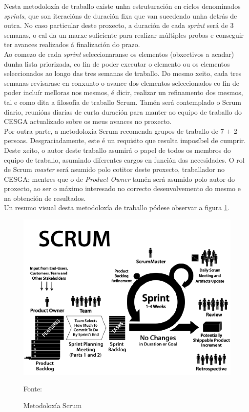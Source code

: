Nesta metodoloxía de traballo existe unha estruturación en ciclos denominados \textit{sprints}, que son iteracións de duración fixa que van sucedendo unha detrás de outra. No caso particular deste proxecto, a duración de cada \textit{sprint} será de 3 semanas, o cal da un marxe suficiente para realizar múltiples probas e conseguir ter avances realizados á finalización do prazo.\\

Ao comezo de cada \textit{sprint} seleccionaranse os elementos (obxectivos a acadar) dunha lista priorizada, co fin de poder executar o elemento ou os elementos seleccionados ao longo das tres semanas de traballo. Do mesmo xeito, cada tres semanas revisarase en conxunto o avance dos elementos seleccionados co fin de poder incluír melloras nos mesmos, é dicir, realizar un refinamento dos mesmos, tal e como dita a filosofía de traballo Scrum. Tamén será contemplado o Scrum diario, reunións diarias de curta duración para manter ao equipo de traballo do CESGA actualizado sobre os meus avances no proxecto.\\

Por outra parte, a metodoloxía Scrum recomenda grupos de traballo de 7 $ \pm $ 2 persoas. Desgraciadamente, este é un requisito que resulta imposíbel de cumprir. Deste xeito, o autor deste traballo asumirá o papel de todos os membros do equipo de traballo, asumindo diferentes cargos en función das necesidades. O rol de Scrum \textit{master} será asumido polo cotitor deste proxecto, traballador no \gls{CESGA}; mentres que o de \textit{Product Owner} tamén será asumido polo autor do proxecto, ao ser o máximo interesado no correcto desenvolvemento do mesmo e na obtención de resultados.\\

Un resumo visual desta metodoloxía de traballo pódese observar a figura \ref{ScrumFigure}.

\begin{figure}
\centerline{\includegraphics[width=15cm]{figuras/Scrum.png}}
\caption{Metodoloxía Scrum}
\medskip
\small
\centerline{Fonte: \cite{ScrumPrimer}}
\label{ScrumFigure}
\end{figure}

